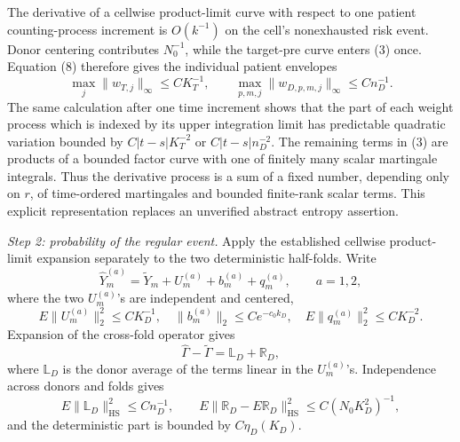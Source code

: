 The derivative of a cellwise product-limit curve with respect to one
patient counting-process increment is \(O(k^{-1})\) on the cell's
nonexhausted risk event.  Donor centering contributes \(N_0^{-1}\), while
the target-pre curve enters (3) once.  Equation (8) therefore gives the
individual patient envelopes
\[
 \max_j\|w_{T,j}\|_\infty\le C K_T^{-1},
 \qquad
 \max_{p,m,j}\|w_{D,p,m,j}\|_\infty\le C n_D^{-1}.        \tag{9}
\]
The same calculation after one time increment shows that the part of each
weight process which is indexed by its upper integration limit has
predictable quadratic variation bounded by \(C|t-s|K_T^{-2}\) or
\(C|t-s|n_D^{-2}\).  The remaining terms in (3) are products of a bounded
factor curve with one of finitely many scalar martingale integrals.  Thus
the derivative process is a sum of a fixed number, depending only on
\(r\), of time-ordered martingales and bounded finite-rank scalar terms.
This explicit representation replaces an unverified abstract entropy
assertion.

\emph{Step 2: probability of the regular event.}
Apply the established cellwise product-limit expansion separately to the
two deterministic half-folds.  Write
\[
 \widehat Y_m^{(a)}=\widetilde Y_m+U_m^{(a)}+b_m^{(a)}+q_m^{(a)},
 \qquad a=1,2,                                               \tag{10}
\]
where the two \(U_m^{(a)}\)'s are independent and centered,
\[
 E\|U_m^{(a)}\|_2^2\le CK_D^{-1},
 \quad \|b_m^{(a)}\|_2\le Ce^{-c_0k_D},
 \quad E\|q_m^{(a)}\|_2^2\le CK_D^{-2}.                  \tag{11}
\]
Expansion of the cross-fold operator gives
\[
 \widehat\Gamma-\widetilde\Gamma=\mathbb L_D+\mathbb R_D, \tag{12}
\]
where \(\mathbb L_D\) is the donor average of the terms linear in the
\(U_m^{(a)}\)'s.  Independence across donors and folds gives
\[
 E\|\mathbb L_D\|_{\mathrm{HS}}^2\le Cn_D^{-1},
 \qquad
 E\|\mathbb R_D-E\mathbb R_D\|_{\mathrm{HS}}^2
 \le C(N_0K_D^2)^{-1},                                    \tag{13}
\]
and the deterministic part is bounded by \(C\eta_D(K_D)\).

